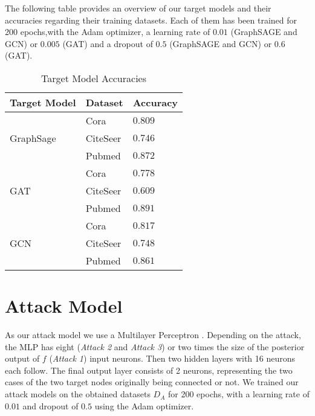     The following table provides an overview of our target models and their accuracies regarding their training datasets.
    Each of them has been trained for 200 epochs,with the Adam optimizer, a learning rate of $0.01$ (GraphSAGE and GCN) or $0.005$ (GAT) and a dropout of $0.5$ (GraphSAGE and GCN) or $0.6$ (GAT). 
    \vspace{0.48cm}
    \begin{table}[!h]
      \centering
      \footnotesize
      \begin{tabular}{l|l|l}
        \toprule
        Target Model & Dataset & Accuracy \\
        \midrule
          \multirow{3}{4em}{GraphSage} & Cora & $0.809$ \\
          & CiteSeer & $0.746$ \\
          & Pubmed & $0.872$ \\

          \multirow{3}{4em}{GAT} & Cora & $0.778$ \\
          & CiteSeer & $0.609$ \\
          & Pubmed & $0.891$ \\

          \multirow{3}{4em}{GCN} & Cora & $0.817$ \\
          & CiteSeer & $0.748$ \\
          & Pubmed & $0.861$ \\
          
        \bottomrule
      \end{tabular}
      \caption{Target Model Accuracies}
      \label{table:target-models}
    \end{table}

  \section{Attack Model}
    As our attack model we use a Multilayer Perceptron .
    Depending on the attack, the MLP has eight (\emph{Attack 2} and \emph{Attack 3}) or two times the size of the posterior output of $f$ (\emph{Attack 1}) input neurons.
    Then two hidden layers with 16 neurons each follow.
    The final output layer consists of 2 neurons, representing the two cases of the two target nodes originally being connected or not.
    We trained our attack models on the obtained datasets $D_A$ for 200 epochs, with a learning rate of $0.01$ and dropout of $0.5$ using the Adam optimizer.
